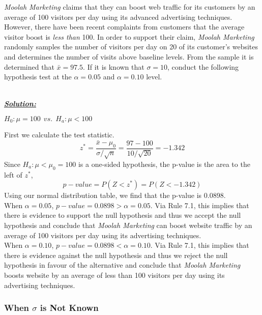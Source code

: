 \begin{example}
\textit{Moolah Marketing} claims that they can boost web traffic for its customers by an average of 100 visitors per day using its advanced advertising techniques. However, there have been recent complaints from customers that the average visitor boost is \textit{less than} 100. In order to support their claim, \textit{Moolah Marketing} randomly samples the number of visitors per day on 20 of its customer's websites and determines the number of visits above baseline levels. From the sample it is determined that $\bar{x}=97.5$. If it is known that $\sigma=10$, conduct the following hypothesis test at the $\alpha = 0.05$ and $\alpha = 0.10$ level. 


\hfill\\
{\emph{\textbf{\underline{Solution:}}}}

\begin{center}
$H_0: \mu = 100 ~~vs.~~ H_a: \mu < 100$
\end{center}

First we calculate the test statistic. 
\[ z^* = \frac{\bar{x}-\mu_0}{\sigma/\sqrt{n}} = \frac{97-100}{10/\sqrt{20}} = -1.342\]
Since $H_a: \mu < \mu_0=100$ is a one-sided hypothesis, the p-value is the area to the left of $z^*$,
\[ p-value = P(Z<z^{*}) = P(Z<-1.342)\]
Using our normal distribution table, we find that the p-value is 0.0898. \\

When $\alpha=0.05$, $p-value=0.0898 >\alpha=0.05$. Via Rule 7.1, this implies that there is evidence to support the null hypothesis and thus we accept the null hypothesis and conclude that \textit{Moolah Marketing} can boost website traffic by an average of 100 visitors per day using its advertising techniques. \\

When $\alpha=0.10$, $p-value=0.0898 < \alpha=0.10$. Via Rule 7.1, this implies that there is evidence against the null hypothesis and thus we reject the null hypothesis in favour of the alternative and conclude that \textit{Moolah Marketing} boosts website by an average of less than 100 visitors per day using its advertising techniques. 
\end{example}










\subsubsection{When $\sigma$ is Not Known}


